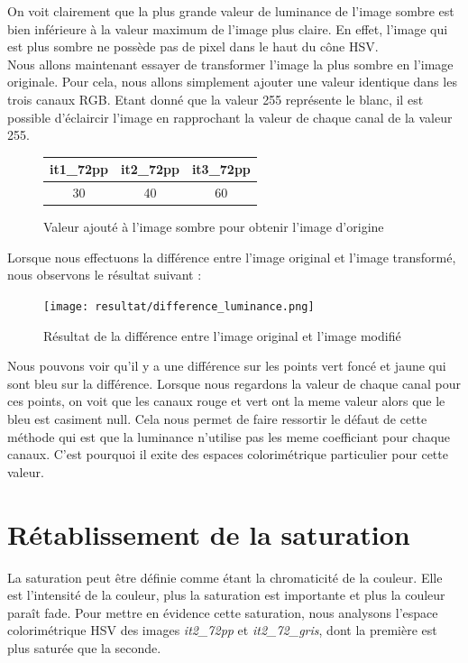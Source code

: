 \documentclass[a4paper,10pt]{article}
\begin{document}
On voit clairement que la plus grande valeur de luminance de l'image sombre est bien inférieure
à la valeur maximum de l'image plus claire. En effet, l'image qui est plus sombre ne possède pas de pixel dans le haut du cône HSV.\\

Nous allons maintenant essayer de transformer l'image la plus sombre en l'image originale. Pour cela,
nous allons simplement ajouter une valeur identique dans les trois canaux RGB. Etant donné que la valeur 255
représente le blanc, il est possible d'éclaircir l'image en rapprochant la valeur de chaque canal de la valeur 255.

\begin{figure}[!h]
	\begin{center}
	\begin{tabular}{|c|c|c|}
 		\hline
 		it1\_72pp & it2\_72pp & it3\_72pp\\
 		\hline
 		30 & 40 & 60\\
 		\hline
	\end{tabular}
	\caption{Valeur ajouté à l'image sombre pour obtenir l'image d'origine}
	\end{center}
\end{figure}

Lorsque nous effectuons la différence entre l'image original et l'image transformé, nous observons le résultat suivant :

\begin{figure}[!h]
 \begin{center}
 \texttt{[image: resultat/difference\_luminance.png]}
 \caption{Résultat de la différence entre l'image original et l'image modifié}
 \end{center}
\end{figure}

Nous pouvons voir qu'il y a une différence sur les points vert foncé et jaune qui sont bleu sur la différence. Lorsque nous regardons la valeur de chaque canal pour ces points, on voit que les canaux rouge et vert ont la meme valeur alors que le bleu est casiment null. Cela nous permet de faire ressortir le défaut de cette méthode qui est que la luminance n'utilise pas les meme coefficiant pour chaque canaux. C'est pourquoi il exite des espaces colorimétrique particulier pour cette valeur. 

\section{Rétablissement de la saturation}
La saturation peut être définie comme étant la chromaticité de la couleur. Elle est l'intensité de la couleur, plus
la saturation est importante et plus la couleur paraît fade. Pour mettre en évidence cette saturation, nous analysons
l'espace colorimétrique HSV des images \textit{it2\_72pp} et \textit{it2\_72\_gris}, dont la première est plus saturée
que la seconde.\\
\end{document}
